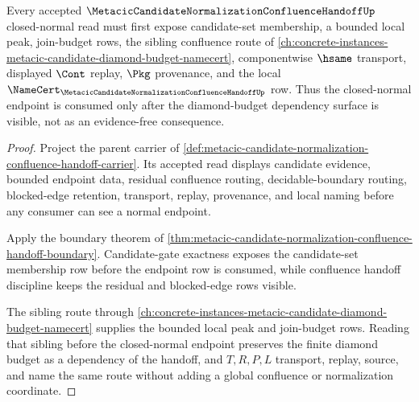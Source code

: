 \begin{theorem}\label{thm:metacic-candidate-normalization-diamond-budget-route}
Every accepted $\MetacicCandidateNormalizationConfluenceHandoffUp$ closed-normal read must first expose candidate-set membership, a bounded local peak, join-budget rows, the sibling confluence route of \autoref{ch:concrete-instances-metacic-candidate-diamond-budget-namecert}, componentwise $\hsame$ transport, displayed $\Cont$ replay, $\Pkg$ provenance, and the local $\NameCert_{\MetacicCandidateNormalizationConfluenceHandoffUp}$ row. Thus the closed-normal endpoint is consumed only after the diamond-budget dependency surface is visible, not as an evidence-free consequence.
\end{theorem}
\begin{proof}
Project the parent carrier of \autoref{def:metacic-candidate-normalization-confluence-handoff-carrier}. Its accepted read displays candidate evidence, bounded endpoint data, residual confluence routing, decidable-boundary routing, blocked-edge retention, transport, replay, provenance, and local naming before any consumer can see a normal endpoint.

Apply the boundary theorem of \autoref{thm:metacic-candidate-normalization-confluence-handoff-boundary}. Candidate-gate exactness exposes the candidate-set membership row before the endpoint row is consumed, while confluence handoff discipline keeps the residual and blocked-edge rows visible.

The sibling route through \autoref{ch:concrete-instances-metacic-candidate-diamond-budget-namecert} supplies the bounded local peak and join-budget rows. Reading that sibling before the closed-normal endpoint preserves the finite diamond budget as a dependency of the handoff, and $T,R,P,L$ transport, replay, source, and name the same route without adding a global confluence or normalization coordinate.
\end{proof}
